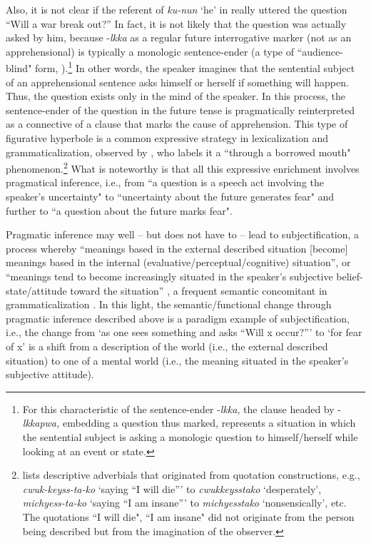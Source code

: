 \documentclass[output=paper,colorlinks,citecolor=brown]{langscibook}
\begin{document}
Also, it is not clear if the referent of \textit{ku-nun} `he' in  really uttered the question ``Will a war break out?'' In fact, it is not likely that the question was actually asked by him, because \nobreakdash-\textit{lkka} as a regular future interrogative marker (not as an apprehensional) is typically a monologic sentence-ender (a type of ``audience-blind" form, \citealt[105]{RheeKoo2017}).\footnote{For this characteristic of the sentence-ender \nobreakdash-\textit{lkka}, the clause headed by \nobreakdash-\textit{lkkapwa,} embedding a question thus marked, represents a situation in which the sentential subject is asking a monologic question to himself/herself while looking at an event or state.} In other words, the speaker imagines that the sentential subject of an apprehensional sentence asks himself or herself if something will happen. Thus, the question exists only in the mind of the speaker. In this process, the sentence-ender of the question in the future tense is pragmatically reinterpreted as a connective of a clause that marks the cause of apprehension. This type of figurative hyperbole is a common expressive strategy in  lexicalization and grammaticalization, observed by \citet{Rhee2009}, who labels it a ``through a borrowed mouth" phenomenon.\footnote{\citet{Rhee2009} lists descriptive adverbials that originated from quotation constructions, e.g., \textit{cwuk-keyss-ta-ko} `saying ``I will die''' to \textit{cwukkeysstako} `desperately', \textit{michyess-ta-ko} `saying ``I am insane''' to \textit{michyesstako} `nonsensically', etc. The quotations ``I will die", ``I am insane" did not originate from the person being described but from the imagination of the observer.} What is noteworthy is that all this expressive enrichment involves pragmatical inference, i.e., from ``a question is a speech act involving the speaker's uncertainty" to ``uncertainty about the future generates fear" and further to ``a question about the future marks fear".

Pragmatic inference may well -- but does not have to -- lead to subjectification, a process whereby ``meanings based in the external described situation [become] meanings based in the internal (evaluative/perceptual/cognitive) situation'', or ``meanings tend to become increasingly situated in the speaker's subjective belief-state/attitude toward the situation'' \citep[208--209]{TraugottKönig1991}, a frequent semantic concomitant in grammaticalization \citep{Traugott2003}. In this light, the semantic/functional change through pragmatic inference described above is a paradigm example of subjectification, i.e., the change from `as one sees something and asks ``Will x occur?''' to `for fear of x' is a shift from a description of the world (i.e., the external described situation) to one of a mental world (i.e., the meaning situated in the speaker's subjective attitude).
\end{document}
